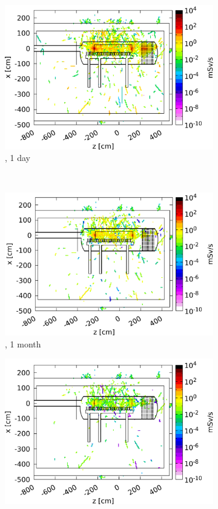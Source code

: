 \begin{figure}[!h]
\begin{subfigure}[b]{0.32\textwidth}
   \centering
    \includegraphics[width=\textwidth]{Figures/BeamDump/Design1_3.png}
   \caption{\designone, 1 day}
   \end{subfigure}\\ 
    \begin{subfigure}[b]{0.32\textwidth}
   \centering
    \includegraphics[width=\textwidth]{Figures/BeamDump/Design1_4.png}
   \caption{\designone, 1 month}
   \end{subfigure}
      \hfill
    \begin{subfigure}[b]{0.32\textwidth}
   \centering
    \includegraphics[width=\textwidth]{Figures/BeamDump/Design1_5.png}

\end{subfigure}
\end{figure}
